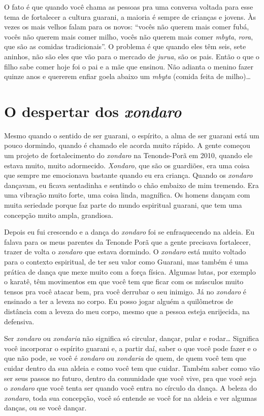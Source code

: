 O fato é que quando você chama as pessoas pra uma conversa voltada para
esse tema de fortalecer a cultura guarani, a maioria é sempre de
crianças e jovens. Às vezes os mais velhos falam para os novos: ``vocês
não querem mais comer fubá, vocês não querem mais comer milho, vocês
não querem mais comer \emph{mbyta}, \emph{rora}, que são as comidas tradicionais''. O
problema é que quando eles têm seis, sete aninhos, não são eles que vão
para o mercado de \emph{jurua}, são os pais. Então o que o filho sabe comer
hoje foi o pai e a mãe que ensinou. Não adianta o menino fazer quinze
anos e quererem enfiar goela abaixo um \emph{mbyta} (comida feita de milho)\ldots{}

\section{O despertar dos \emph{xondaro}}

Mesmo quando o sentido de ser guarani, o espírito, a alma de ser guarani
está um pouco dormindo, quando é chamado ele acorda muito rápido. A
gente começou um projeto de fortalecimento do \emph{xondaro} na Tenonde-Porã
em 2010, quando ele estava muito, muito adormecido. \emph{Xondaro}, que são os
guardiões, era uma coisa que sempre me emocionava bastante quando eu
era criança. Quando os \emph{xondaro} dançavam, eu ficava sentadinha e
sentindo o chão embaixo de mim tremendo. Era uma vibração muito forte,
uma coisa linda, magnífica. Os homens dançam com muita seriedade porque
faz parte do mundo espiritual guarani, que tem uma concepção muito
ampla, grandiosa.

Depois eu fui crescendo e a dança do \emph{xondaro} foi se enfraquecendo na
aldeia. Eu falava para os meus parentes da Tenonde Porã que a gente
precisava fortalecer, trazer de volta o \emph{xondaro} que estava dormindo. O
\emph{xondaro} está muito voltado para o contexto espiritual, de ter seu valor
como Guarani, mas também é uma prática de dança que mexe muito com a
força física. Algumas lutas, por exemplo o karatê, têm movimentos em
que você tem que ficar com os músculos muito tensos pra você atacar
bem, pra você derrubar o seu inimigo. Já no \emph{xondaro} é ensinado a ter a
leveza no corpo. Eu posso jogar alguém a quilômetros de distância com a
leveza do meu corpo, mesmo que a pessoa esteja enrijecida, na
defensiva.

Ser \emph{xondaro} ou \emph{xondaria} não significa só circular, dançar, pular e
rodar\ldots{} Significa você incorporar o espírito guarani e, a partir daí,
saber o que você pode fazer e o que não pode, se você é \emph{xondaro} ou
\emph{xondaria} de quem, de quem você tem que cuidar dentro da sua aldeia e
como você tem que cuidar. Também saber como vão ser seus passos no
futuro, dentro da comunidade que você vive, pra que você seja o \emph{xondaro}
que você tenta ser quando você entra no círculo da dança. A beleza do
\emph{xondaro}, toda sua concepção, você só entende se você for na aldeia e
ver algumas danças, ou se você dançar.

